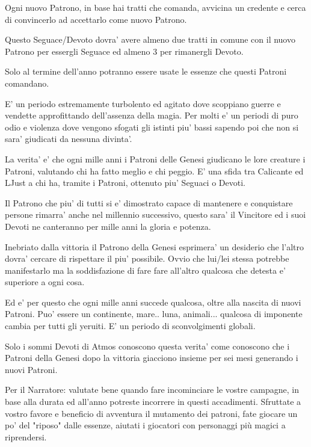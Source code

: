\documentclass[a4paper,11pt,twoside,openany]{book}
\begin{document}
Ogni nuovo Patrono, in base hai tratti che comanda, avvicina un credente e cerca di convincerlo ad accettarlo come nuovo Patrono.

Questo Seguace/Devoto dovra' avere almeno due tratti in comune con il nuovo Patrono per essergli Seguace ed almeno 3 per rimanergli Devoto.

Solo al termine dell'anno potranno essere usate le essenze che questi Patroni comandano.

E' un periodo estremamente turbolento ed agitato dove scoppiano guerre e vendette approfittando dell'assenza della magia. Per molti e' un periodi di puro odio e violenza dove vengono sfogati gli istinti piu' bassi sapendo poi che non si sara' giudicati da nessuna divinta'.

La verita' e' che ogni mille anni i Patroni delle Genesi giudicano le lore creature i Patroni, valutando chi ha fatto meglio e chi peggio. E' una sfida tra Calicante ed LJust a chi ha, tramite i Patroni, ottenuto piu' Seguaci o Devoti.

Il Patrono che piu' di tutti si e' dimostrato capace di mantenere e conquistare persone rimarra' anche nel millennio successivo, questo sara' il Vincitore ed i suoi Devoti ne canteranno per mille anni la gloria e potenza.

Inebriato dalla vittoria il Patrono della Genesi esprimera' un desiderio che l'altro dovra' cercare di rispettare il piu' possibile. Ovvio che lui/lei stessa potrebbe manifestarlo ma la soddisfazione di fare fare all'altro qualcosa che detesta e' superiore a ogni cosa.

Ed e' per questo che ogni mille anni succede qualcosa, oltre alla nascita di nuovi Patroni. Puo' essere un continente, mare.. luna, animali... qualcosa di imponente cambia per tutti gli yeruiti. E' un periodo di sconvolgimenti globali.

Solo i sommi Devoti di Atmos conoscono questa verita' come conoscono che i Patroni della Genesi dopo la vittoria giacciono insieme per sei mesi generando i nuovi Patroni.

\bigskip

Per il Narratore: valutate bene quando fare incominciare le vostre campagne, in base alla durata ed all'anno potreste incorrere in questi accadimenti.
Sfruttate a vostro favore e beneficio di avventura il mutamento dei patroni, fate giocare un po' del "riposo" dalle essenze, aiutati i giocatori con personaggi più magici a riprendersi.

\pagebreak
\end{document}
